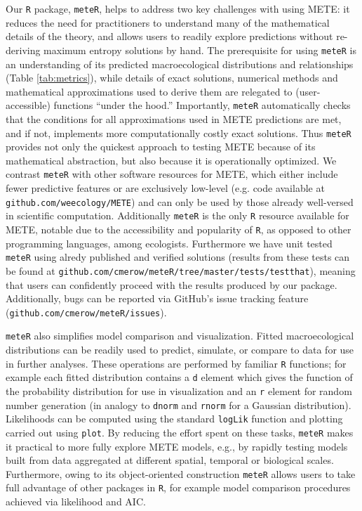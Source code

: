 Our \texttt{R} package, \texttt{meteR}, helps to address two key
challenges with using METE: it reduces the need for practitioners to
understand many of the mathematical details of the theory, and allows
users to readily explore predictions without re-deriving maximum
entropy solutions by hand. The prerequisite for using \texttt{meteR}
is an understanding of its predicted macroecological distributions and
relationships (Table \ref{tab:metrics}), while details of exact
solutions, numerical methods and mathematical approximations used to
derive them are relegated to (user-accessible) functions ``under the
hood.'' Importantly, \texttt{meteR} automatically checks that the
conditions for all approximations used in METE predictions are met,
and if not, implements more computationally costly exact solutions.
Thus \texttt{meteR} provides not only the quickest approach to testing
METE because of its mathematical abstraction, but also because it is
operationally optimized. We contrast \texttt{meteR} with other
software resources for METE, which either include fewer predictive
features \citep{kitzes2016} or are exclusively low-level (e.g. code
available at \texttt{github.com/weecology/METE}) and can only be used
by those already well-versed in scientific computation. Additionally
\texttt{meteR} is the only \texttt{R} resource available for METE,
notable due to the accessibility and popularity of \texttt{R}, as
opposed to other programming languages, among ecologists. Furthermore
we have unit tested \texttt{meteR} using alredy published and verified
solutions \cite{Harte:2011ut, newman2014} (results from these tests
can be found at
\texttt{github.com/cmerow/meteR/tree/master/tests/testthat}), meaning
that users can confidently proceed with the results produced by our
package. Additionally, bugs can be reported via GitHub's issue
tracking feature (\texttt{github.com/cmerow/meteR/issues}).

\texttt{meteR} also simplifies model comparison and visualization.
Fitted macroecological distributions can be readily used to predict,
simulate, or compare to data for use in further analyses. These
operations are performed by familiar \texttt{R} functions; for example
each fitted distribution contains a \texttt{d} element which gives the
function of the probability distribution for use in visualization and
an \texttt{r} element for random number generation (in analogy to
\texttt{dnorm} and \texttt{rnorm} for a Gaussian distribution).
Likelihoods can be computed using the standard \texttt{logLik}
function and plotting carried out using \texttt{plot}. By reducing the
effort spent on these tasks, \texttt{meteR} makes it practical to more
fully explore METE models, e.g., by rapidly testing models built from
data aggregated at different spatial, temporal or biological scales.
Furthermore, owing to its object-oriented construction \texttt{meteR}
allows users to take full advantage of other packages in \texttt{R},
for example model comparison procedures achieved via likelihood and
AIC.

